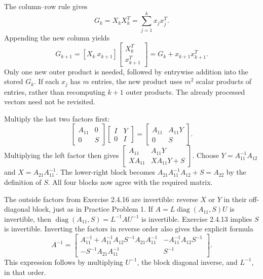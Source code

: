 The column--row rule gives
\[G_k=X_kX_k^T=\sum_{j=1}^k x_jx_j^T.\]
Appending the new column yields
\[G_{k+1}=[X_k\ x_{k+1}]\begin{bmatrix}X_k^T\\x_{k+1}^T\end{bmatrix}
=G_k+x_{k+1}x_{k+1}^T.\]
Only one new outer product is needed, followed by entrywise addition
into the stored $G_k$. If each $x_j$ has $m$ entries, the new product
uses $m^2$ scalar products of entries, rather than recomputing $k+1$
outer products. The already processed vectors need not be revisited.

Multiply the last two factors first:
\[\begin{bmatrix}A_{11}&0\\0&S\end{bmatrix}
\begin{bmatrix}I&Y\\0&I\end{bmatrix}
=\begin{bmatrix}A_{11}&A_{11}Y\\0&S\end{bmatrix}.\]
Multiplying the left factor then gives
$\begin{bmatrix}A_{11}&A_{11}Y\\XA_{11}&XA_{11}Y+S\end{bmatrix}$.
Choose $Y=A_{11}^{-1}A_{12}$ and $X=A_{21}A_{11}^{-1}$.
The lower-right block becomes
$A_{21}A_{11}^{-1}A_{12}+S=A_{22}$ by the definition of $S$.
All four blocks now agree with the required matrix.

The outside factors from Exercise 2.4.16 are invertible: reverse
$X$ or $Y$ in their off-diagonal block, just as in Practice Problem 1.
If $A=L\operatorname{diag}(A_{11},S)U$ is invertible, then
$\operatorname{diag}(A_{11},S)=L^{-1}AU^{-1}$ is invertible.
Exercise 2.4.13 implies $S$ is invertible. Inverting the factors in
reverse order also gives the explicit formula
\[A^{-1}=\begin{bmatrix}
A_{11}^{-1}+A_{11}^{-1}A_{12}S^{-1}A_{21}A_{11}^{-1}&-A_{11}^{-1}A_{12}S^{-1}\\
-S^{-1}A_{21}A_{11}^{-1}&S^{-1}
\end{bmatrix}.\]
This expression follows by multiplying $U^{-1}$, the block diagonal
inverse, and $L^{-1}$, in that order.

